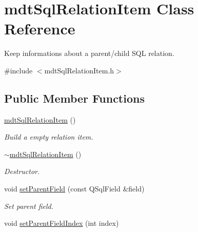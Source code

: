 \hypertarget{classmdt_sql_relation_item}{
\section{mdtSqlRelationItem Class Reference}
\label{classmdt_sql_relation_item}
}


Keep informations about a parent/child SQL relation.  




{\ttfamily \#include $<$mdtSqlRelationItem.h$>$}

\subsection*{Public Member Functions}
\begin{DoxyCompactItemize}
\item 
\hypertarget{classmdt_sql_relation_item_a110c3a684a857767534829ac9f24cc54}{
\hyperlink{classmdt_sql_relation_item_a110c3a684a857767534829ac9f24cc54}{mdtSqlRelationItem} ()}
\label{classmdt_sql_relation_item_a110c3a684a857767534829ac9f24cc54}

\begin{DoxyCompactList}\small\item\em Build a empty relation item. \end{DoxyCompactList}\item 
\hypertarget{classmdt_sql_relation_item_a6ebcdbb9adbb8dbbd353e77176989d1b}{
\hyperlink{classmdt_sql_relation_item_a6ebcdbb9adbb8dbbd353e77176989d1b}{$\sim$mdtSqlRelationItem} ()}
\label{classmdt_sql_relation_item_a6ebcdbb9adbb8dbbd353e77176989d1b}

\begin{DoxyCompactList}\small\item\em Destructor. \end{DoxyCompactList}\item 
\hypertarget{classmdt_sql_relation_item_a235cd2088688f36330938e6fdbd2ed18}{
void \hyperlink{classmdt_sql_relation_item_a235cd2088688f36330938e6fdbd2ed18}{setParentField} (const QSqlField \&field)}
\label{classmdt_sql_relation_item_a235cd2088688f36330938e6fdbd2ed18}

\begin{DoxyCompactList}\small\item\em Set parent field. \end{DoxyCompactList}\item 
\hypertarget{classmdt_sql_relation_item_a63328f85e0b70aa1e588071f071a69b5}{
void \hyperlink{classmdt_sql_relation_item_a63328f85e0b70aa1e588071f071a69b5}{setParentFieldIndex} (int index)}
\label{classmdt_sql_relation_item_a63328f85e0b70aa1e588071f071a69b5}


\end{DoxyCompactItemize}
